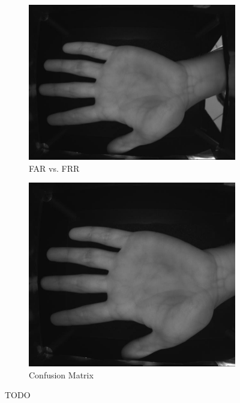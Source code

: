 \begin{enumerate}
    \begin{figure}[!ht]
        \centering
        \begin{subfigure}[t]{0.48\columnwidth}
            \includegraphics[width=\textwidth]{./images/preprocessing/selected_image.jpg}
            \caption{FAR vs. FRR}
            \label{fig:far_vs_frr}
        \end{subfigure}
        \hfill
        \begin{subfigure}[t]{0.48\columnwidth}
            \includegraphics[width=\textwidth]{./images/preprocessing/cropped_image.png}
            \caption{Confusion Matrix}
            \label{fig:confusion_matrix}
        \end{subfigure}
        \caption{TODO}
        \label{fig:far_frr_confusion}
    \end{figure}


\end{enumerate}
